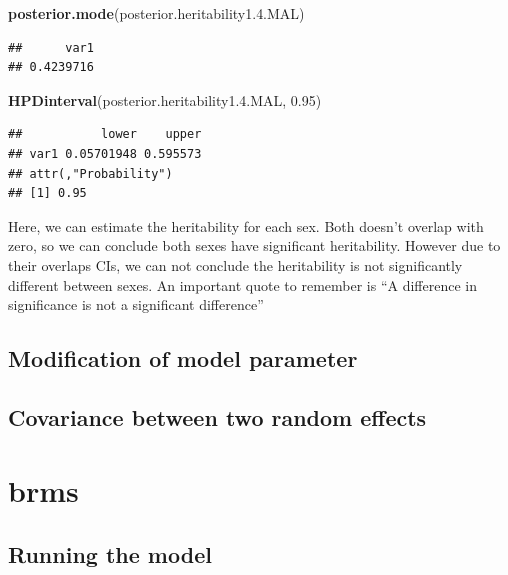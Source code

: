 \documentclass[
  12pt,
]{book}
\newenvironment{Shaded}{\begin{snugshade}}{\end{snugshade}}
\newcommand{\FloatTok}[1]{\textcolor[rgb]{0.00,0.00,0.81}{#1}}
\newcommand{\KeywordTok}[1]{\textcolor[rgb]{0.13,0.29,0.53}{\textbf{#1}}}
\newcommand{\NormalTok}[1]{#1}
\begin{document}
\begin{Shaded}
\begin{Highlighting}[]
\KeywordTok{posterior.mode}\NormalTok{(posterior.heritability1.}\FloatTok{4.}\NormalTok{MAL)}
\end{Highlighting}
\end{Shaded}

\begin{verbatim}
##      var1 
## 0.4239716
\end{verbatim}

\begin{Shaded}
\begin{Highlighting}[]
\KeywordTok{HPDinterval}\NormalTok{(posterior.heritability1.}\FloatTok{4.}\NormalTok{MAL, }\FloatTok{0.95}\NormalTok{)}
\end{Highlighting}
\end{Shaded}

\begin{verbatim}
##           lower    upper
## var1 0.05701948 0.595573
## attr(,"Probability")
## [1] 0.95
\end{verbatim}

Here, we can estimate the heritability for each sex. Both doesn't overlap with zero, so we can conclude both sexes have significant heritability. However due to their overlaps CIs, we can not conclude the heritability is not significantly different between sexes.
An important quote to remember is ``A difference in significance is not a significant difference''

\hypertarget{modification-of-model-parameter-1}{%
\subsection{\texorpdfstring{Modification of model parameter }{Modification of model parameter }}\label{modification-of-model-parameter-1}}

\hypertarget{covariance-between-two-random-effects-1}{%
\subsection{Covariance between two random effects}\label{covariance-between-two-random-effects-1}}

\hypertarget{brms-1}{%
\section{brms}\label{brms-1}}

\hypertarget{running-the-model-2}{%
\subsection{Running the model}\label{running-the-model-2}}
\end{document}
